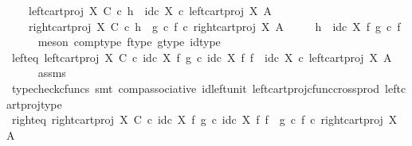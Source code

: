 \begin{isabellebody}
\ \ \ \ left{\isacharunderscore}{\kern0pt}cart{\isacharunderscore}{\kern0pt}proj\ X\ C\ {\isasymcirc}\isactrlsub c\ h\ {\isacharequal}{\kern0pt}\ id\isactrlsub c\ X\ {\isasymcirc}\isactrlsub c\ left{\isacharunderscore}{\kern0pt}cart{\isacharunderscore}{\kern0pt}proj\ X\ A\ {\isasymand}\isanewline
\ \ \ \ right{\isacharunderscore}{\kern0pt}cart{\isacharunderscore}{\kern0pt}proj\ X\ C\ {\isasymcirc}\isactrlsub c\ h\ {\isacharequal}{\kern0pt}\ {\isacharparenleft}{\kern0pt}g\ {\isasymcirc}\isactrlsub c\ f{\isacharparenright}{\kern0pt}\ {\isasymcirc}\isactrlsub c\ right{\isacharunderscore}{\kern0pt}cart{\isacharunderscore}{\kern0pt}proj\ X\ A\ {\isasymlongrightarrow}\isanewline
\ \ \ \ h\ {\isacharequal}{\kern0pt}\ id\isactrlsub c\ X\ {\isasymtimes}\isactrlsub f\ {\isacharparenleft}{\kern0pt}g\ {\isasymcirc}\isactrlsub c\ f{\isacharparenright}{\kern0pt}{\isachardoublequoteclose}\isanewline
\ \ \ \ \isamarkupfalse%
\ {\isacharparenleft}{\kern0pt}meson\ comp{\isacharunderscore}{\kern0pt}type\ f{\isacharunderscore}{\kern0pt}type\ g{\isacharunderscore}{\kern0pt}type\ id{\isacharunderscore}{\kern0pt}type{\isacharparenright}{\kern0pt}\isanewline
\isanewline
\ \ \isamarkupfalse%
\ left{\isacharunderscore}{\kern0pt}eq{\isacharcolon}{\kern0pt}\ {\isachardoublequoteopen}left{\isacharunderscore}{\kern0pt}cart{\isacharunderscore}{\kern0pt}proj\ X\ C\ {\isasymcirc}\isactrlsub c\ {\isacharparenleft}{\kern0pt}id\isactrlsub c\ X\ {\isasymtimes}\isactrlsub f\ g{\isacharparenright}{\kern0pt}\ {\isasymcirc}\isactrlsub c\ {\isacharparenleft}{\kern0pt}id\isactrlsub c\ X\ {\isasymtimes}\isactrlsub f\ f{\isacharparenright}{\kern0pt}\ {\isacharequal}{\kern0pt}\ id\isactrlsub c\ X\ {\isasymcirc}\isactrlsub c\ left{\isacharunderscore}{\kern0pt}cart{\isacharunderscore}{\kern0pt}proj\ X\ A{\isachardoublequoteclose}\isanewline
\ \ \ \ \isamarkupfalse%
\ assms\ \isamarkupfalse%
\ {\isacharparenleft}{\kern0pt}typecheck{\isacharunderscore}{\kern0pt}cfuncs{\isacharcomma}{\kern0pt}\ smt\ comp{\isacharunderscore}{\kern0pt}associative{}\ id{\isacharunderscore}{\kern0pt}left{\isacharunderscore}{\kern0pt}unit{}\ left{\isacharunderscore}{\kern0pt}cart{\isacharunderscore}{\kern0pt}proj{\isacharunderscore}{\kern0pt}cfunc{\isacharunderscore}{\kern0pt}cross{\isacharunderscore}{\kern0pt}prod\ left{\isacharunderscore}{\kern0pt}cart{\isacharunderscore}{\kern0pt}proj{\isacharunderscore}{\kern0pt}type{\isacharparenright}{\kern0pt}\isanewline
\ \ \isamarkupfalse%
\ right{\isacharunderscore}{\kern0pt}eq{\isacharcolon}{\kern0pt}\ {\isachardoublequoteopen}right{\isacharunderscore}{\kern0pt}cart{\isacharunderscore}{\kern0pt}proj\ X\ C\ {\isasymcirc}\isactrlsub c\ {\isacharparenleft}{\kern0pt}id\isactrlsub c\ X\ {\isasymtimes}\isactrlsub f\ g{\isacharparenright}{\kern0pt}\ {\isasymcirc}\isactrlsub c\ {\isacharparenleft}{\kern0pt}id\isactrlsub c\ X\ {\isasymtimes}\isactrlsub f\ f{\isacharparenright}{\kern0pt}\ {\isacharequal}{\kern0pt}\ {\isacharparenleft}{\kern0pt}g\ {\isasymcirc}\isactrlsub c\ f{\isacharparenright}{\kern0pt}\ {\isasymcirc}\isactrlsub c\ right{\isacharunderscore}{\kern0pt}cart{\isacharunderscore}{\kern0pt}proj\ X\ A{\isachardoublequoteclose}\isanewline

\end{isabellebody}
